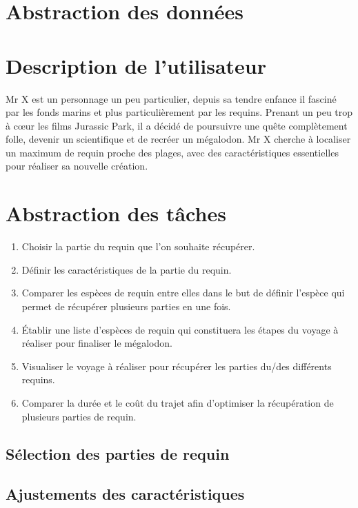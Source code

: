 \documentclass{article}
\begin{document}
\newpage
\section{Abstraction des données}



\newpage
\section{Description de l’utilisateur}

Mr X est un personnage un peu particulier, depuis sa tendre enfance il fasciné par les fonds marins et plus particulièrement par les requins. Prenant un peu trop à cœur les films Jurassic Park, il a décidé de poursuivre une quête complètement folle, devenir un scientifique et de recréer un mégalodon. Mr X cherche à localiser un maximum de requin proche des plages, avec des caractéristiques essentielles pour réaliser sa nouvelle création.

\section{Abstraction des tâches}

\begin{enumerate}
	\item Choisir la partie du requin que l’on souhaite récupérer.
	\item Définir les caractéristiques de la partie du requin.
	\item Comparer les espèces de requin entre elles dans le but de définir l’espèce qui permet de récupérer plusieurs parties en une fois.
	\item Établir une liste d’espèces de requin qui constituera les étapes du voyage à réaliser pour finaliser le mégalodon.
	\item Visualiser le voyage à réaliser pour récupérer les parties du/des différents requins.
	\item Comparer la durée et le coût du trajet afin d’optimiser la récupération de plusieurs parties de requin.
\end{enumerate}

\subsection{Sélection des parties de requin}

\subsection{Ajustements des caractéristiques}
\end{document}
